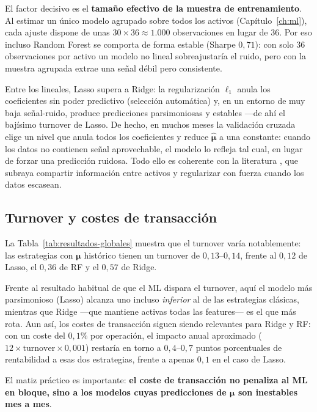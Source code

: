 El factor decisivo es el \textbf{tamaño efectivo de la muestra de
entrenamiento}. Al estimar un único modelo agrupado sobre todos los activos
(Capítulo~\ref{ch:ml}), cada ajuste dispone de unas $30 \times 36 \approx 1.000$
observaciones en lugar de 36. Por eso incluso Random Forest se comporta de forma
estable (Sharpe $0{,}71$): con solo 36 observaciones por activo un modelo no
lineal sobreajustaría el ruido, pero con la muestra agrupada extrae una señal
débil pero consistente.

Entre los lineales, Lasso supera a Ridge: la regularización $\ell_1$ anula los
coeficientes sin poder predictivo (selección automática) y, en un entorno de muy
baja señal-ruido, produce predicciones parsimoniosas y estables ---de ahí el
bajísimo turnover de Lasso. De hecho, en muchos meses la validación cruzada elige
un nivel que anula todos los coeficientes y reduce $\hat{\boldsymbol{\mu}}$ a una
constante: cuando los datos no contienen señal aprovechable, el modelo lo
refleja tal cual, en lugar de forzar una predicción ruidosa. Todo ello es coherente con la literatura \cite{Gu2020}, que
subraya compartir información entre activos y regularizar con fuerza cuando los
datos escasean.

\subsection{Turnover y costes de transacción}

La Tabla~\ref{tab:resultados-globales} muestra que el turnover varía
notablemente: las estrategias con $\boldsymbol{\mu}$ histórico tienen un
turnover de $0{,}13$--$0{,}14$, frente al $0{,}12$ de Lasso, el $0{,}36$ de RF
y el $0{,}57$ de Ridge.

Frente al resultado habitual de que el ML dispara el turnover,
aquí el modelo más parsimonioso (Lasso) alcanza uno incluso
\emph{inferior} al de las estrategias clásicas, mientras que Ridge ---que
mantiene activas todas las features--- es el que más rota. Aun así, los costes
de transacción siguen siendo relevantes para Ridge y RF: con un coste del
$0{,}1\%$ por operación, el impacto anual aproximado ($12 \times
\text{turnover} \times 0{,}001$) restaría en torno a $0{,}4$--$0{,}7$ puntos
porcentuales de rentabilidad a esas dos estrategias, frente a apenas $0{,}1$
en el caso de Lasso.

El matiz práctico es importante: \textbf{el coste de transacción no penaliza
al ML en bloque, sino a los modelos cuyas predicciones de $\boldsymbol{\mu}$
son inestables mes a mes}.

